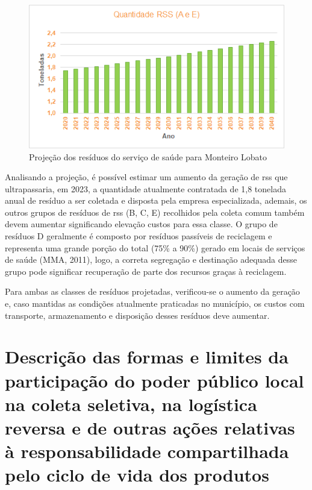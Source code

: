 \begin{figure}[h]
	\centering
	\includegraphics[width=0.7\linewidth]{produtos/prodquatro/proj_rss}
	\caption{Projeção dos resíduos do serviço de saúde para Monteiro Lobato}
	\label{fig:projrss}
\end{figure}

Analisando a projeção, é possível estimar um aumento da geração de \gls{rss} que ultrapassaria, em 2023, a quantidade atualmente contratada de 1,8 tonelada anual de resíduo a ser coletada e disposta pela empresa especializada, ademais, os outros grupos de resíduos de \gls{rss} (B, C, E) recolhidos pela coleta comum também devem aumentar significando elevação custos para essa classe. O grupo de resíduos D geralmente é composto por resíduos passíveis de reciclagem e representa uma grande porção do total (75\% a 90\%) gerado em locais de serviços de saúde (MMA, 2011), logo, a correta segregação e destinação adequada desse grupo pode significar recuperação de parte dos recursos graças à reciclagem.   

Para ambas as classes de resíduos projetadas, verificou-se o aumento da geração e, caso mantidas as condições atualmente praticadas no município, os custos com transporte, armazenamento e disposição desses resíduos deve aumentar. 

\newpage
\FloatBarrier
\section{Descrição das formas e limites da participação do poder público local na coleta seletiva, na logística reversa e de outras ações relativas à responsabilidade compartilhada pelo ciclo de vida dos produtos}
\label{sec:lim_poder_pub}


